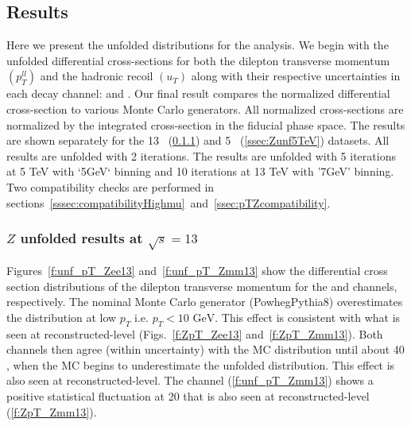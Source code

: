\subsection{Results}
\label{sec:Zresult}

Here we present the unfolded distributions for the \Zboson analysis. We begin with the unfolded differential cross-sections for both the dilepton transverse momentum $\left(p_{T}^{ll} \right)$ and the hadronic recoil $\left(u_{T}\right)$ along with their respective uncertainties in each \Zboson decay channel: \Zee and \Zmm. Our final result compares the normalized differential cross-section to various Monte Carlo generators. All normalized cross-sections are normalized by the integrated cross-section in the fiducial phase space. The results are shown separately for the 13 \TeV ~(\ref{ssec:Zunf13TeV}) and 5 \TeV ~(\ref{ssec:Zunf5TeV}) datasets. All \ptdilep results are unfolded with 2 iterations. The \ut results are unfolded with 5 iterations at 5 TeV with `5GeV` binning and 10 iterations at 13 TeV with '7GeV' binning. %
Two compatibility checks are performed in sections~\ref{sssec:compatibilityHighmu}~and~\ref{ssec:pTZcompatibility}.



\subsubsection{$Z$ unfolded results at $\sqrt{s} = 13$~\TeV}
\label{ssec:Zunf13TeV}

Figures~\ref{f:unf_pT_Zee13} and~\ref{f:unf_pT_Zmm13} show the differential cross section distributions of the dilepton transverse momentum for the \Zee and \Zmm channels, respectively. The nominal Monte Carlo generator (PowhegPythia8) overestimates the distribution at low $p_{T}$ i.e. $p_{T} < 10 \textrm{ GeV}$. This effect is consistent with what is seen at reconstructed-level (Figs.~\ref{f:ZpT_Zee13} and~\ref{f:ZpT_Zmm13}). Both channels then agree (within uncertainty) with the MC distribution until about 40 \GeV, when the MC begins to underestimate the unfolded distribution. This effect is also seen at reconstructed-level. The \Zmm channel (\ref{f:unf_pT_Zmm13}) shows a positive statistical fluctuation at 20 \GeV that is also seen at reconstructed-level (\ref{f:ZpT_Zmm13}).

